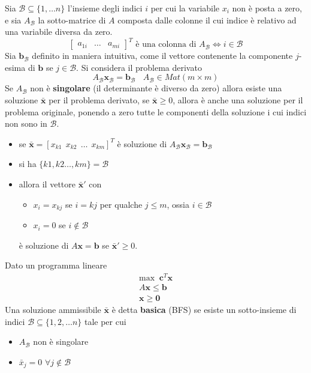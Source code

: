 \documentclass[10pt, letterpaper]{report}
\begin{document}
Sia $\mathcal B \subseteq \{1,\dots n\}$ l'insieme degli indici $i$ per cui la variabile $x_i$ non è posta a zero, e sia $A_{\mathcal B}$ la sotto-matrice di $A$ composta dalle colonne il cui indice è relativo ad una variabile diversa da zero.
$$ \begin{bmatrix}
    a_{1i} & \dots & a_{mi}
\end{bmatrix}^T \text{ è una colonna di }A_{\mathcal B} \iff i\in\mathcal B$$
Sia $\mathbf b_{\mathcal B}$ definito in maniera intuitiva, come il vettore contenente la componente $j$-esima di $\mathbf b$ se $j\in \mathcal B$. Si considera il problema derivato \begin{equation}
    A_{\mathcal B}\mathbf x_{\mathcal B}=\mathbf b_{\mathcal B} \ \ \ \ A_{\mathcal{B}}\in Mat(m\times m)
\end{equation}
Se $A_{\mathcal{B}}$ non è \textbf{singolare} (il determinante è diverso da zero) allora esiste una soluzione $\bar{ \mathbf x}$ per il problema derivato, se $\bar{ \mathbf x}\ge 0$, allora è anche una soluzione per il problema originale, ponendo a zero tutte le componenti della soluzione i cui indici non sono in $\mathcal B$.\begin{itemize}
    \item se $\bar{ \mathbf x}=[x_{k1} \ \ x_{k2} \ \ \dots \ \ x_{km}]^T$ è soluzione di  $ A_{\mathcal B}\mathbf x_{\mathcal B}=\mathbf b_{\mathcal B}$
    \item si ha $\{k1,k2\dots, km\}=\mathcal B$
    \item allora il vettore $\bar{ \mathbf x}'$ con\begin{itemize}
        \item $x_i = x_{kj}$ se $i=kj$ per qualche $j\le m$, ossia $i\in\mathcal B$
        \item $x_i = 0 $ se $i \notin \mathcal B$
    \end{itemize}
    è soluzione di $A\mathbf x = \mathbf b$ se $\bar{ \mathbf x}'\ge 0$.
\end{itemize}
\begin{definizione}
    Dato un programma lineare $$
    \begin{matrix}
        \text{max } \ \mathbf c^T\mathbf x\\ 
        A\mathbf x \le \mathbf b\\ 
        \mathbf x \ge \mathbf  0
    \end{matrix}
    $$
    Una soluzione ammissibile $\bar{\mathbf x}$ è detta \textbf{basica} (BFS) se esiste un sotto-insieme di indici $\mathcal B\subseteq \{1,2,\dots n\}$ tale per cui\begin{itemize}
        \item $A_{\mathcal B}$ non è singolare 
        \item $\bar{x}_j=0$ $\forall j \notin \mathcal{B}$
    \end{itemize}
\end{definizione}
\end{document}
